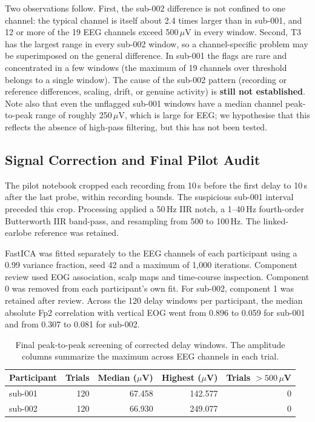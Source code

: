 \documentclass[11pt,a4paper]{article}
\begin{document}
Two observations follow. First, the sub-002 difference is not confined to one channel: the typical channel is itself
about 2.4 times larger than in sub-001, and 12 or more of the 19 EEG channels exceed 500\,$\mu$V in every window. Second,
T3 has the largest range in every sub-002 window, so a channel-specific problem may be superimposed on the general
difference. In sub-001 the flags are rare and concentrated in a few windows (the maximum of 19 channels over threshold
belongs to a single window). The cause of the sub-002 pattern (recording or reference differences, scaling, drift, or
genuine activity) is \textbf{still not established}. Note also that even the unflagged sub-001 windows have a median
channel peak-to-peak range of roughly 250\,$\mu$V, which is large for EEG; we hypothesise that this reflects the
absence of high-pass filtering, but this has not been tested.

\subsection{Signal Correction and Final Pilot Audit}
The pilot notebook cropped each recording from 10\,s before the first delay
to 10\,s after the last probe, within recording bounds. The suspicious
sub-001 interval preceded this crop. Processing applied a 50\,Hz IIR notch,
a 1--40\,Hz fourth-order Butterworth IIR band-pass, and resampling from
500 to 100\,Hz. The linked-earlobe reference was retained.

FastICA was fitted separately to the EEG channels of each participant using
a 0.99 variance fraction, seed 42 and a maximum of 1{,}000 iterations.
Component review used EOG association, scalp maps and time-course inspection.
Component 0 was removed from each participant's own fit. For sub-002,
component 1 was retained after review. Across the 120 delay windows per
participant, the median absolute Fp2 correlation with vertical EOG went from
0.896 to 0.059 for sub-001 and from 0.307 to 0.081 for sub-002.

\begin{table}[H]\centering
\caption{Final peak-to-peak screening of corrected delay windows. The amplitude
columns summarize the maximum across EEG channels in each trial.}
\begin{tabular}{lrrrr}
\toprule
Participant & Trials & Median ($\mu$V) & Highest ($\mu$V) & Trials $>500\,\mu$V \\
\midrule
sub-001 & 120 & 67.458 & 142.577 & 0 \\
sub-002 & 120 & 66.930 & 249.077 & 0 \\
\bottomrule
\end{tabular}
\end{table}
\end{document}
